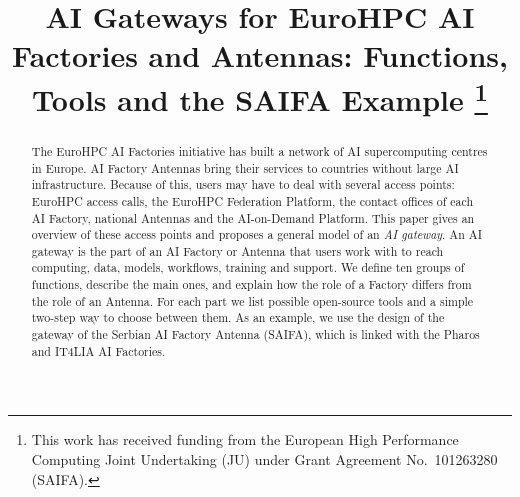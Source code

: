 \documentclass[conference,a4paper]{IEEEtran}
\begin{document}
\title{AI Gateways for EuroHPC AI Factories and Antennas: Functions, Tools and the SAIFA Example%
\thanks{This work has received funding from the European High Performance Computing Joint Undertaking (JU) under Grant Agreement No.~101263280 (SAIFA).}}

\author{
\and
{}
\and
{}
}

\maketitle
{}

\begin{abstract}
The EuroHPC AI Factories initiative has built a network of AI supercomputing centres in Europe. AI Factory Antennas bring their services to countries without large AI infrastructure. Because of this, users may have to deal with several access points: EuroHPC access calls, the EuroHPC Federation Platform, the contact offices of each AI Factory, national Antennas and the AI-on-Demand Platform. This paper gives an overview of these access points and proposes a general model of an \emph{AI gateway}. An AI gateway is the part of an AI Factory or Antenna that users work with to reach computing, data, models, workflows, training and support. We define ten groups of functions, describe the main ones, and explain how the role of a Factory differs from the role of an Antenna. For each part we list possible open-source tools and a simple two-step way to choose between them. As an example, we use the design of the gateway of the Serbian AI Factory Antenna (SAIFA), which is linked with the Pharos and IT4LIA AI Factories.
\end{abstract}
\end{document}
